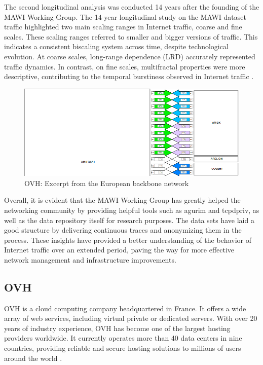 \documentclass[sigconf,authorversion,nonacm]{acmart}
\begin{document}
The second longitudinal analysis was conducted 14 years after the founding of the MAWI Working Group. The 14-year longitudinal study on the MAWI dataset traffic highlighted two main scaling ranges in Internet traffic, coarse and fine scales. These scaling ranges referred to smaller and bigger versions of traffic. This indicates a consistent biscaling system across time, despite technological evolution. At coarse scales, long-range dependence (LRD) accurately represented traffic dynamics. In contrast, on fine scales, multifractal properties were more descriptive, contributing to the temporal burstiness observed in Internet traffic \cite{7878657}.

\begin{figure}
    \centering
    \includegraphics[width=\linewidth]{OVH/ovh.png}
    \caption{OVH: Excerpt from the European backbone network}
    \label{OVH: Excerpt from the European backbone network}
\end{figure}

Overall, it is evident that the MAWI Working Group has greatly helped the networking community by providing helpful tools such as agurim and tcpdpriv, as well as the data repository itself for research purposes. The data sets have laid a good structure by delivering continuous traces and anonymizing them in the process. These insights have provided a better understanding of the behavior of Internet traffic over an extended period, paving the way for more effective network management and infrastructure improvements.

\subsection{OVH}
OVH is a cloud computing company headquartered in France. It offers a wide array of web services, including virtual private or dedicated servers. With over 20 years of industry experience, OVH has become one of the largest hosting providers worldwide. It currently operates more than 40 data centers in nine countries, providing reliable and secure hosting solutions to millions of users around the world \cite{ovhcloudwebsite}.
\end{document}
